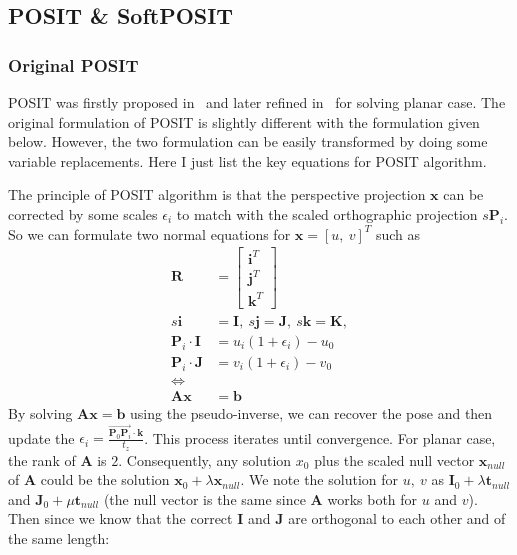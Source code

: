 \documentclass[a4paper]{report}
\begin{document}
\subsection{POSIT \& SoftPOSIT}
\subsubsection{Original POSIT}
POSIT was firstly proposed in~\cite{dementhon1995model} and later refined in~\cite{oberkampf1996iterative} for solving planar case. The original formulation of POSIT is slightly different with the formulation given below. However, the two formulation can be easily transformed by doing some variable replacements. Here I just list the key equations for POSIT algorithm.

The principle of POSIT algorithm is that the perspective projection $\mathbf{x}$ can be corrected by some scales $\epsilon_i$ to match with the scaled orthographic projection $s\mathbf{P}_i$. So we can formulate two normal equations for $\mathbf{x}=[u,\ v]^T$ such as
\begin{align*}
\mathbf{R} &= \left[
\begin{matrix}
\mathbf{i}^T \\ \mathbf{j}^T \\ \mathbf{k}^T
\end{matrix}
\right] \\
s\mathbf{i} &= \mathbf{I},\ s\mathbf{j} = \mathbf{J},\ s\mathbf{k} = \mathbf{K},\\
\mathbf{P}_i \cdot \mathbf{I} &=u_i(1+\epsilon_i)-u_0 \\
\mathbf{P}_i \cdot \mathbf{J} &=v_i(1+\epsilon_i)-v_0 \\
\Leftrightarrow & \\
\mathbf{A}\mathbf{x}&=\mathbf{b}
\end{align*}
By solving $\mathbf{A}\mathbf{x}=\mathbf{b}$ using the pseudo-inverse, we can recover the pose and then update the $\epsilon_i=\frac{\overrightarrow{\mathbf{P}_0\mathbf{P}_i} \cdot \mathbf{k}}{t_z}$. This process iterates until convergence. For planar case, the rank of $\mathbf{A}$ is $2$. Consequently, any solution $x_0$ plus the scaled null vector $\mathbf{x}_{null}$ of $\mathbf{A}$ could be the solution $\mathbf{x}_{0}+\lambda\mathbf{x}_{null}$. We note the solution for $u,\ v$ as $\mathbf{I}_0+\lambda \mathbf{t}_{null}$ and $\mathbf{J}_0+\mu\mathbf{t}_{null}$ (the null vector is the same since $\mathbf{A}$ works both for $u$ and $v$). Then since we know that the correct $\mathbf{I}$ and $\mathbf{J}$ are orthogonal to each other and of the same length:
\end{document}
